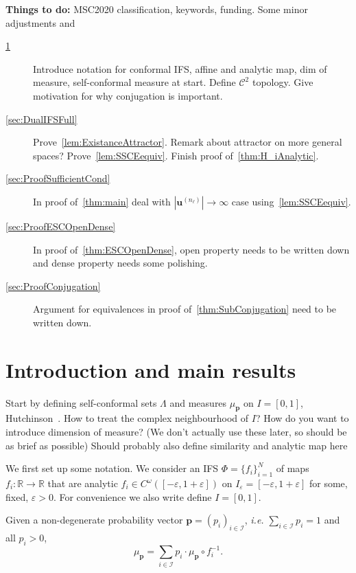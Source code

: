 \documentclass[12pt,]{article}
\theoremstyle{definition}
\theoremstyle{remark}
\renewcommand{\Bbb}[1]{\mathbb{#1}}
\newcommand{\bbR}{{\Bbb R}}        %
\newcommand{\0}{\mathbf{0}}
\newcommand{\ie}{{\it i.e.}\/ }
\newcommand{\eps}{\varepsilon}
\newcommand{\bu}{\mathbf{u}}
\begin{document}
{{\color{blue}
\textbf{Things to do:}
MSC2020 classification, keywords, funding. Some minor adjustments and
\begin{description}
\item[\cref{sec:intro}] Introduce notation for conformal IFS, affine and analytic map, dim of measure, self-conformal measure at start. Define $\mathcal{C}^2$ topology. Give motivation for why conjugation is important. 
\item[\cref{sec:DualIFSFull}] Prove~\cref{lem:ExistanceAttractor}. Remark about attractor on more general spaces? Prove~\cref{lem:SSCEequiv}. Finish proof of~\cref{thm:H_iAnalytic}. 
\item[\cref{sec:ProofSufficientCond}] In proof of~\cref{thm:main} deal with $|\bu^{(n_\ell)}| \to \infty$ case using~\cref{lem:SSCEequiv}.
\item[\cref{sec:ProofESCOpenDense}] In proof of~\cref{thm:ESCOpenDense}, open property needs to be written down and dense property needs some polishing.
\item[\cref{sec:ProofConjugation}] Argument for equivalences in proof of~\cref{thm:SubConjugation} need to be written down.
\end{description}
}


%
%

\section{Introduction and main results} \label{sec:intro}

{\color{red}
Start by defining self-conformal sets $\Lambda$ and measures $\mu_{\mathbf{p}}$ on $I=[0,1]$, Hutchinson~\cite{Hutchinson_Attractor_81}. How to treat the complex neighbourhood of $I$? How do you want to introduce dimension of measure? (We don't actually use these later, so should be as brief as possible) Should probably also define similarity and analytic map here

We first set up some notation. We consider an IFS $\Phi=\{f_i\}_{i=1}^N$ of maps $f_i:\bbR\to\bbR$
that are analytic $f_i \in C^\omega([-\eps,1+\eps])$ on $I_{\eps}=[-\eps,1+\eps]$ for some, fixed, $\eps>0$.
For convenience we also write define $I=[0,1]$.

Given a non-degenerate probability vector $\mathbf{p}=(p_i)_{i\in\mathcal{I}}$, \ie $\sum_{i\in\mathcal{I}}p_i=1$ and all $p_i>0$,
\begin{equation*}
\mu_{\mathbf{p}}=\sum_{i \in \mathcal{I}} p_i \cdot \mu_{\mathbf{p}} \circ f_i^{-1} .
\end{equation*}

}}
\end{document}
